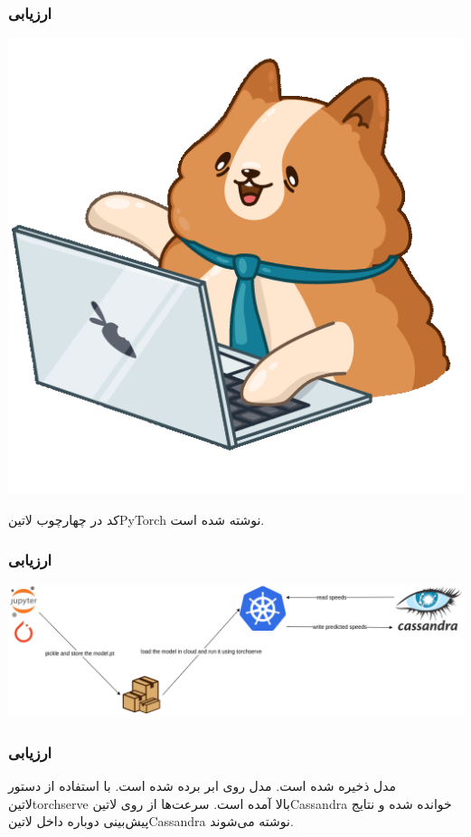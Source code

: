 \documentclass{beamer}
\begin{document}
\begin{frame}
  \frametitle{ارزیابی}
  \includegraphics[height=.5\textheight]{./img/bernard.png}
  \begin{block}{}
  کد در چهارچوب ‌لاتین{PyTorch} نوشته شده است.
  \end{block}
\end{frame}

\begin{frame}
  \frametitle{ارزیابی}
  \includegraphics[width=\textwidth]{./img/software.png}
\end{frame}

\begin{frame}
  \frametitle{ارزیابی}
   مدل ذخیره شده است.
   مدل روی ابر برده شده است.
   با استفاده از دستور ‌لاتین{torchserve} بالا آمده است.
   سرعت‌ها از روی ‌لاتین{Cassandra} خوانده شده و نتایج پیش‌بینی دوباره داخل ‌لاتین{Cassandra} نوشته می‌شوند.
\end{frame}
\end{document}
